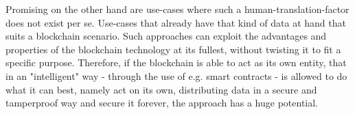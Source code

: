 Promising on the other hand are use-cases where such a human-translation-factor does not exist per se. Use-cases that already have that kind of data at hand that suits a blockchain scenario. Such approaches can exploit the advantages and properties of the blockchain technology at its fullest, without twisting it to fit a specific purpose.
Therefore, if the blockchain is able to act as its own entity, that in an "intelligent" way - through the use of e.g. smart contracts - is allowed to do what it can best, namely act on its own, distributing data in a secure and tamperproof way and secure it forever, the approach has a huge potential. 